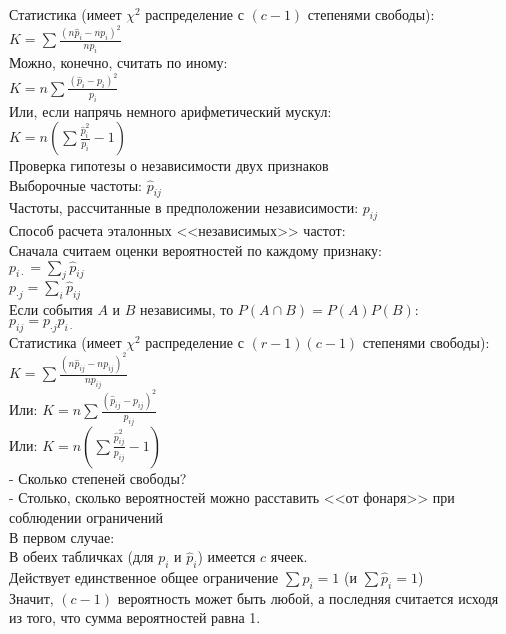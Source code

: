 \documentclass[pdftex,12pt,a4paper]{article}
\begin{document}
Статистика (имеет $\chi^{2}$ распределение с $(c-1)$ степенями
свободы):
$K=\sum \frac{(n\hat{p}_{i}-np_{i})^{2}}{np_{i}}$ \\
Можно, конечно, считать по иному: \\
$K=n \sum \frac{(\hat{p}_{i}-p_{i})^{2}}{p_{i}}$ \\
Или, если напрячь немного арифметический мускул: \\
$K=n \left(\sum{\frac{\hat{p}_{i}^{2}}{p_{i}}} - 1 \right)$ \\


Проверка гипотезы о независимости двух признаков \\

Выборочные частоты: $\hat{p}_{ij}$ \\
Частоты, рассчитанные в предположении независимости: $p_{ij}$ \\

Способ расчета эталонных <<независимых>> частот: \\
Сначала считаем оценки вероятностей по каждому признаку: \\
$p_{i\cdot}=\sum_{j}\hat{p}_{ij}$ \\
$p_{\cdot j}=\sum_{i}\hat{p}_{ij}$ \\
Если события $A$ и $B$ независимы, то $P(A\cap B)=P(A)P(B)$:\\
$p_{ij}=p_{\cdot j}p_{i\cdot}$ \\

Статистика (имеет $\chi^{2}$ распределение с $(r-1)(c-1)$
степенями свободы):
$K=\sum \frac{(n\hat{p}_{ij}-np_{ij})^{2}}{np_{ij}}$ \\
Или:
$K=n \sum \frac{(\hat{p}_{ij}-p_{ij})^{2}}{p_{ij}}$ \\
Или:
$K=n \left(\sum{\frac{\hat{p}_{ij}^{2}}{p_{ij}}} - 1 \right)$ \\




- Сколько степеней свободы? \\
- Столько, сколько вероятностей можно расставить <<от фонаря>> при соблюдении ограничений\\
В первом случае: \\
В обеих табличках (для $p_{i}$ и $\hat{p}_{i}$) имеется $c$ ячеек.
\\
Действует единственное общее ограничение $\sum p_{i}=1$ (и $\sum
\hat{p}_{i}=1$) \\
Значит, $(c-1)$ вероятность может быть любой, а последняя
считается исходя из того, что сумма вероятностей равна 1. \\
\end{document}
